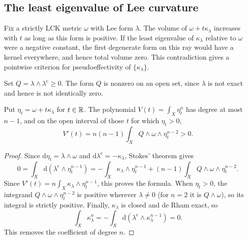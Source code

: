 \subsection{The least eigenvalue of Lee curvature}
\label{subsec:lck-minimum-lee-curvature}

Fix a strictly LCK metric $\omega$ with Lee form $\lambda$.
The volume of $\omega+t\kappa_\lambda$ increases with $t$ as long
as this form is positive. If the least eigenvalue of
$\kappa_\lambda$ relative to $\omega$ were a negative constant, the
first degenerate form on this ray would have a kernel everywhere,
and hence total volume zero. This contradiction gives a pointwise
criterion for pseudoeffectivity of $\{\kappa_\lambda\}$.

Set $Q=\lambda\wedge\lambda^{\mathrm c}\geq0$.
The form $Q$ is nonzero on an open set, since $\lambda$ is
not exact and hence is not identically zero.

\begin{proposition}\label{lck:lee-volume-ray}
Put $\eta_t=\omega+t\kappa_\lambda$ for $t\in\mathbb R$. The
polynomial $V(t)=\int_X\eta_t^n$ has degree at most $n-1$, and on
the open interval of those $t$ for which $\eta_t>0$,
\[
 V'(t)=n(n-1)\int_XQ\wedge\omega\wedge\eta_t^{n-2}>0.
\]
\end{proposition}
\begin{proof}
Since $\mathrm d\eta_t=\lambda\wedge\omega$ and
$\mathrm d\lambda^{\mathrm c}=-\kappa_\lambda$, Stokes' theorem gives
\[
 0=\int_X\mathrm d(\lambda^{\mathrm c}\wedge\eta_t^{n-1})
  =-\int_X\kappa_\lambda\wedge\eta_t^{n-1}
    +(n-1)\int_XQ\wedge\omega\wedge\eta_t^{n-2}.
\]
Since $V'(t)=n\int_X\kappa_\lambda\wedge\eta_t^{n-1}$, this proves
the formula. When $\eta_t>0$, the integrand $Q\wedge\omega\wedge\eta_t^{n-2}$
is positive wherever $\lambda\ne0$ (for $n=2$ it is $Q\wedge\omega$),
so its integral is strictly positive.
Finally, $\kappa_\lambda$ is closed and de Rham exact, so
\[
 \int_X\kappa_\lambda^n
 =-\int_X\mathrm d(\lambda^{\mathrm c}\wedge
                         \kappa_\lambda^{n-1})=0.
\]
This removes the coefficient of degree $n$.
\end{proof}

